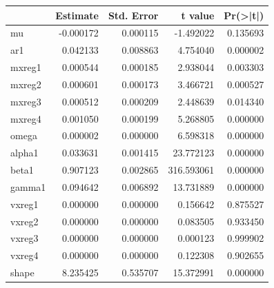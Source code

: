 \documentclass[
  11pt,
]{article}
\newenvironment{Shaded}{\begin{snugshade}}{\end{snugshade}}
\newcommand{\CommentTok}[1]{\textcolor[rgb]{0.56,0.35,0.01}{\textit{#1}}}
\newcommand{\DataTypeTok}[1]{\textcolor[rgb]{0.13,0.29,0.53}{#1}}
\newcommand{\DecValTok}[1]{\textcolor[rgb]{0.00,0.00,0.81}{#1}}
\newcommand{\KeywordTok}[1]{\textcolor[rgb]{0.13,0.29,0.53}{\textbf{#1}}}
\newcommand{\NormalTok}[1]{#1}
\newcommand{\OperatorTok}[1]{\textcolor[rgb]{0.81,0.36,0.00}{\textbf{#1}}}
\newcommand{\OtherTok}[1]{\textcolor[rgb]{0.56,0.35,0.01}{#1}}
\newcommand{\StringTok}[1]{\textcolor[rgb]{0.31,0.60,0.02}{#1}}
\begin{document}
\begin{tabular}{l|r|r|r|r}
\hline
  &  Estimate &  Std. Error &  t value & Pr(>|t|)\\
\hline
mu & -0.000172 & 0.000115 & -1.492022 & 0.135693\\
\hline
ar1 & 0.042133 & 0.008863 & 4.754040 & 0.000002\\
\hline
mxreg1 & 0.000544 & 0.000185 & 2.938044 & 0.003303\\
\hline
mxreg2 & 0.000601 & 0.000173 & 3.466721 & 0.000527\\
\hline
mxreg3 & 0.000512 & 0.000209 & 2.448639 & 0.014340\\
\hline
mxreg4 & 0.001050 & 0.000199 & 5.268805 & 0.000000\\
\hline
omega & 0.000002 & 0.000000 & 6.598318 & 0.000000\\
\hline
alpha1 & 0.033631 & 0.001415 & 23.772123 & 0.000000\\
\hline
beta1 & 0.907123 & 0.002865 & 316.593061 & 0.000000\\
\hline
gamma1 & 0.094642 & 0.006892 & 13.731889 & 0.000000\\
\hline
vxreg1 & 0.000000 & 0.000000 & 0.156642 & 0.875527\\
\hline
vxreg2 & 0.000000 & 0.000000 & 0.083505 & 0.933450\\
\hline
vxreg3 & 0.000000 & 0.000000 & 0.000123 & 0.999902\\
\hline
vxreg4 & 0.000000 & 0.000000 & 0.122308 & 0.902655\\
\hline
shape & 8.235425 & 0.535707 & 15.372991 & 0.000000\\
\hline
\end{tabular}

\begin{Shaded}
\end{Shaded}
\end{document}

